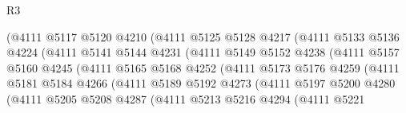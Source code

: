 \begin{lexlean}{R3}
\begin{coremodule}
                            (@4111
                              @5117
                              @5120
                              @4210
                              (@4111
                                @5125
                                @5128
                                @4217
                                (@4111
                                  @5133
                                  @5136
                                  @4224
                                  (@4111
                                    @5141
                                    @5144
                                    @4231
                                    (@4111
                                      @5149
                                      @5152
                                      @4238
                                      (@4111
                                        @5157
                                        @5160
                                        @4245
                                        (@4111
                                          @5165
                                          @5168
                                          @4252
                                          (@4111
                                            @5173
                                            @5176
                                            @4259
                                            (@4111
                                              @5181
                                              @5184
                                              @4266
                                              (@4111
                                                @5189
                                                @5192
                                                @4273
                                                (@4111
                                                  @5197
                                                  @5200
                                                  @4280
                                                  (@4111
                                                    @5205
                                                    @5208
                                                    @4287
                                                    (@4111
                                                      @5213
                                                      @5216
                                                      @4294
                                                      (@4111
                                                        @5221

\end{coremodule}
\end{lexlean}
